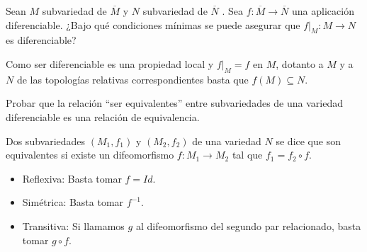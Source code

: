 \documentclass[twoside]{article}
\newcounter{ejercicio}
\begin{document}
\newpage

\begin{ejercicio}{12}
Sean $M$ subvariedad de $\overline{M}$ y $N$ subvariedad de $\overline{N}$ . Sea $f : \overline{M} \to \overline{N}$ una
aplicación diferenciable. ¿Bajo qué condiciones mínimas se puede asegurar
que $f|_M : M \to N$ es diferenciable?
\end{ejercicio}
\begin{solucion}
Como ser diferenciable es una propiedad local y $f|_M=f$ en $M$, dotanto a $M$ y a $N$ de las topologías relativas correspondientes basta que $f(M)\subseteq N$.
\end{solucion}

\newpage

\begin{ejercicio}{13}
Probar que la relación ``ser equivalentes'' entre subvariedades de una variedad
diferenciable es una relación de equivalencia.
\end{ejercicio}
\begin{solucion}
Dos subvariedades $(M_1, f_1)$ y $(M_2, f_2)$ de una variedad $N$ se
dice que son equivalentes si existe un difeomorfismo $f : M_1 \to M_2$ tal que
$f_1 = f_2 \circ f$.
\begin{itemize}
\item Reflexiva: Basta tomar $f=Id$. 
\item Simétrica: Basta tomar $f^{-1}$.
\item Transitiva: Si llamamos $g$ al difeomorfismo del segundo par relacionado, basta tomar $g\circ f$.
\end{itemize}
\end{solucion}

\newpage
\end{document}
